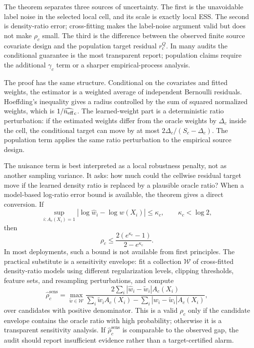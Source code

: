 The theorem separates three sources of uncertainty. The first is the unavoidable label noise in the selected local cell, and its scale is exactly local ESS. The second is density-ratio error; cross-fitting makes the label-noise argument valid but does not make \(\rho_c\) small. The third is the difference between the observed finite source covariate design and the population target residual \(r_c^Q\). In many audits the conditional guarantee is the most transparent report; population claims require the additional \(\gamma_c\) term or a sharper empirical-process analysis.

The proof has the same structure. Conditional on the covariates and fitted weights, the estimator is a weighted average of independent Bernoulli residuals. Hoeffding's inequality gives a radius controlled by the sum of squared normalized weights, which is \(1/\widehat{n_{\mathrm{eff}}}_c\). The learned-weight part is a deterministic ratio perturbation: if the estimated weights differ from the oracle weights by \(\Delta_c\) inside the cell, the conditional target can move by at most \(2\Delta_c/(S_c-\Delta_c)\). The population term applies the same ratio perturbation to the empirical source design.

The nuisance term is best interpreted as a local robustness penalty, not as another sampling variance. It asks: how much could the cellwise residual target move if the learned density ratio is replaced by a plausible oracle ratio? When a model-based log-ratio error bound is available, the theorem gives a direct conversion. If
\[
\sup_{i:A_c(X_i)=1}
\left|\log \widehat w_i-\log w(X_i)\right|
\le \kappa_c ,
\qquad \kappa_c<\log 2,
\]
then
\[
\rho_c
\le
\frac{2(e^{\kappa_c}-1)}{2-e^{\kappa_c}} .
\]
In most deployments, such a bound is not available from first principles. The practical substitute is a sensitivity envelope: fit a collection \(\mathcal W\) of cross-fitted density-ratio models using different regularization levels, clipping thresholds, feature sets, and resampling perturbations, and compute
\[
\widehat\rho_c^{\mathrm{sens}}
=
\max_{\widetilde w\in\mathcal W}
\frac{
2\sum_i|\widehat w_i-\widetilde w_i|A_c(X_i)
}{
\sum_i\widetilde w_iA_c(X_i)
-
\sum_i|\widehat w_i-\widetilde w_i|A_c(X_i)
},
\]
over candidates with positive denominator. This is a valid \(\rho_c\) only if the candidate envelope contains the oracle ratio with high probability; otherwise it is a transparent sensitivity analysis. If \(\widehat\rho_c^{\mathrm{sens}}\) is comparable to the observed gap, the audit should report insufficient evidence rather than a target-certified alarm.

